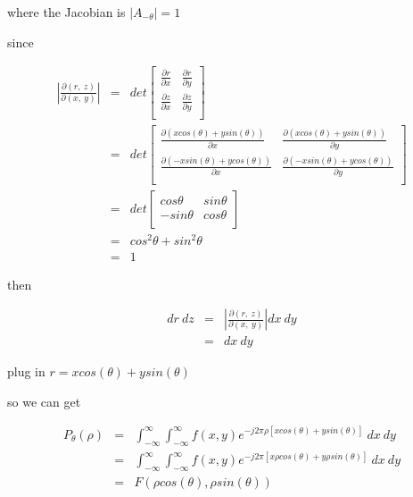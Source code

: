 \documentclass{article}
\begin{document}
where the Jacobian is $|A_{-\theta}|=1$

since

\begin{eqnarray}    \label{eq2}
	{|\frac{\partial(r,\ z)}{\partial(x,\ y)}|}&=&det\begin{bmatrix}
		\frac{\partial r}{\partial x} & \frac{\partial r}{\partial y} \\
		\frac{\partial z}{\partial x} & \frac{\partial z}{\partial y} \\
	\end{bmatrix} \nonumber    \\
	~&=&det\begin{bmatrix}
		\frac{\partial (xcos(\theta)+ysin(\theta))}{\partial x} & \frac{\partial (xcos(\theta)+ysin(\theta))}{\partial y} \\
		\frac{\partial (-xsin(\theta)+ycos(\theta))}{\partial x} & \frac{\partial (-xsin(\theta)+ycos(\theta))}{\partial y} \\
	\end{bmatrix} \nonumber    \\
	~&=&det\begin{bmatrix}
		cos\theta & sin\theta \\
		-sin\theta & cos\theta\\
	\end{bmatrix} \nonumber    \\
	~&=&cos^2\theta+sin^2\theta \nonumber    \\
	~&=&1
\end{eqnarray}

then

\begin{eqnarray}    \label{eq3}
	dr\ dz&=&|\frac{\partial(r,\ z)}{\partial(x,\ y)}|dx\ dy \nonumber    \\
	~&=&dx\ dy
\end{eqnarray}

plug in $r=xcos(\theta)+ysin(\theta)$

so we can get

\begin{eqnarray}    \label{eq4}
	P_{\theta}(\rho)&=&\int_{-\infty}^{\infty}\int_{-\infty}^{\infty}f(x,y)e^{-j2\pi\rho[xcos(\theta)+ysin(\theta)]}\ dx\ dy \nonumber    \\
	~&=&\int_{-\infty}^{\infty}\int_{-\infty}^{\infty}f(x,y)e^{-j2\pi[x\rho cos(\theta)+y\rho sin(\theta)]}\ dx\ dy \nonumber    \\
	~&=&F(\rho cos(\theta),\rho sin(\theta))
\end{eqnarray}
\end{document}
